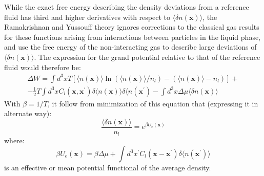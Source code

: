 \documentclass[12pt,a4paper]{article}
\begin{document}
While the exact free energy describing the density deviations from a reference fluid has third and higher derivatives with respect to $\langle \delta n(\textbf{x})\rangle$, the Ramakrishnan and Yussouff theory ignores corrections to the classical gas results for these functions arising from interactions between particles in the liquid phase, and use the free energy of the non-interacting gas to describe large deviations of $\langle \delta n(\textbf{x})\rangle$.
The expression for the grand potential relative to that of the reference fluid would therefore be:
\begin{equation}
\begin{split}
\Delta W = \int d^3xT[\langle n(\textbf{x})\rangle \ln ( \langle n(\textbf{x})\rangle / n_l )-(\langle n(\textbf{x})\rangle - n_l) ]+ \\
 -\frac{1}{2} T \int d^3 xC_l(\textbf{x},\textbf{x}^\prime) \delta\langle n(\textbf{x})\rangle\delta\langle  n(\textbf{x}^\prime) - \int d^3 x \Delta \mu \langle \delta n(\textbf{x})\rangle
\end{split}
\end{equation}
With $\beta=1/T$, it follow from minimization of this equation that (expressing it in alternate way):
\begin{equation}
\frac{\langle \delta n(\textbf{x})\rangle}{n_l}=e^{\beta U_e(\textbf{x})}
\end{equation}
where:
\begin{equation}
\beta U_e(\textbf{x}) = \beta \Delta \mu + \int d^3 x^\prime C_l (\textbf{x}-\textbf{x}^\prime)  \delta\langle n(\textbf{x}^\prime)\rangle
\end{equation}
is an effective or mean potential functional of the average density.
\end{document}
